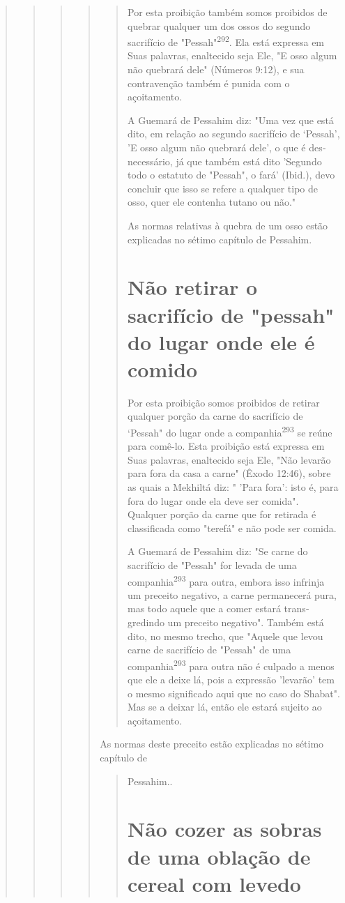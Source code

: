 \begin{quote}
\begin{quote}
\begin{quote}
\begin{quote}
\begin{quote}
Por esta proibição também somos proibidos de quebrar qualquer um dos
ossos do segundo sacrifício de "Pessah"\textsuperscript{292}. Ela está
expressa em Suas pa­lavras, enaltecido seja Ele, "E osso algum não
quebrará dele" (Números 9:12), e sua contravenção também é punida com o
açoitamento.

A Guemará de Pessahim diz: "Uma vez que está dito, em relação ao segundo
sacrifício de `Pessah', 'E osso algum não quebrará dele', o que é
des­necessário, já que também está dito 'Segundo todo o estatuto de
"Pessah", o fará' (Ibid.), devo concluir que isso se refere a qualquer
tipo de osso, quer ele contenha tutano ou não."

As normas relativas à quebra de um osso estão explicadas no sétimo
capítulo de Pessahim.

\section{Não retirar o sacrifício de "pessah" do lugar onde ele é comido}

Por esta proibição somos proibidos de retirar qualquer porção da car­ne
do sacrifício de `Pessah" do lugar onde a companhia\textsuperscript{293}
se reúne para comê-lo. Esta proibição está expressa em Suas palavras,
enaltecido seja Ele, "Não leva­rão para fora da casa a carne" (Êxodo
12:46), sobre as quais a Mekhiltá diz: " 'Pa­ra fora': isto é, para fora
do lugar onde ela deve ser comida". Qualquer porção da carne que for
retirada é classificada como "terefá" e não pode ser comida.

A Guemará de Pessahim diz: "Se carne do sacrifício de "Pessah" for
levada de uma companhia\textsuperscript{293} para outra, embora isso
infrinja um preceito ne­gativo, a carne permanecerá pura, mas todo
aquele que a comer estará trans­gredindo um preceito negativo". Também
está dito, no mesmo trecho, que "Aquele que levou carne de sacrifício de
"Pessah" de uma companhia\textsuperscript{293} para outra não é culpado
a menos que ele a deixe lá, pois a expressão 'levarão' tem o mesmo
significado aqui que no caso do Shabat". Mas se a deixar lá, então ele
estará sujeito ao açoitamento.
\end{quote}

As normas deste preceito estão explicadas no sétimo capítulo de

\begin{quote}
Pessahim..

\section{Não cozer as sobras de uma oblação de cereal com levedo}


\end{quote}
\end{quote}
\end{quote}
\end{quote}
\end{quote}
